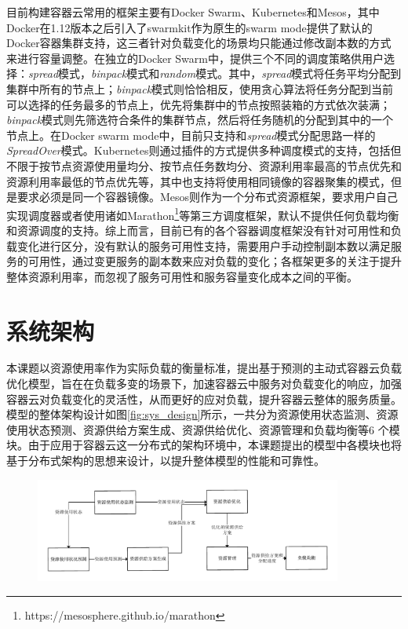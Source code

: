 目前构建容器云常用的框架主要有Docker Swarm、Kubernetes和Mesos，其中Docker在1.12版本之后引入了swarmkit作为原生的swarm mode提供了默认的Docker容器集群支持，这三者针对负载变化的场景均只能通过修改副本数的方式来进行容量调整。在独立的Docker Swarm中，提供三个不同的调度策略供用户选择：\emph{spread}模式，\emph{binpack}模式和\emph{random}模式。其中，\emph{spread}模式将任务平均分配到集群中所有的节点上；\emph{binpack}模式则恰恰相反，使用贪心算法将任务分配到当前可以选择的任务最多的节点上，优先将集群中的节点按照装箱的方式依次装满；\emph{binpack}模式则先筛选符合条件的集群节点，然后将任务随机的分配到其中的一个节点上。在Docker swarm mode中，目前只支持和\emph{spread}模式分配思路一样的\emph{SpreadOver}模式。Kubernetes则通过插件的方式提供多种调度模式的支持，包括但不限于按节点资源使用量均分、按节点任务数均分、资源利用率最高的节点优先和资源利用率最低的节点优先等，其中也支持将使用相同镜像的容器聚集的模式，但是要求必须是同一个容器镜像。Mesos则作为一个分布式资源框架，要求用户自己实现调度器或者使用诸如Marathon\footnote{https://mesosphere.github.io/marathon}等第三方调度框架，默认不提供任何负载均衡和资源调度的支持。综上而言，目前已有的各个容器调度框架没有针对可用性和负载变化进行区分，没有默认的服务可用性支持，需要用户手动控制副本数以满足服务的可用性，通过变更服务的副本数来应对负载的变化；各框架更多的关注于提升整体资源利用率，而忽视了服务可用性和服务容量变化成本之间的平衡。

\section{系统架构}
本课题以资源使用率作为实际负载的衡量标准，提出基于预测的主动式容器云负载优化模型，旨在在负载多变的场景下，加速容器云中服务对负载变化的响应，加强容器云对负载变化的灵活性，从而更好的应对负载，提升容器云整体的服务质量。模型的整体架构设计如图\ref{fig:sys_design}所示，一共分为资源使用状态监测、资源使用状态预测、资源供给方案生成、资源供给优化、资源管理和负载均衡等6 个模块。由于应用于容器云这一分布式的架构环境中，本课题提出的模型中各模块也将基于分布式架构的思想来设计，以提升整体模型的性能和可靠性。
\begin{figure}[htbp]
\centering
\includegraphics[width=0.9\textwidth]{./figure/sys_design}
\end{figure}

